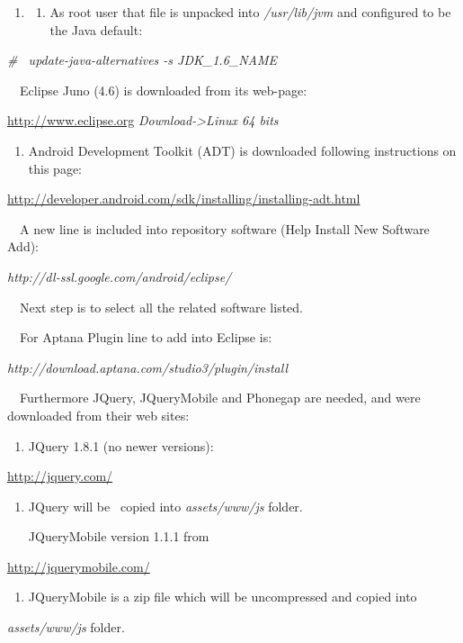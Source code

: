 \documentclass[a4paper]{article}
\begin{document}
\begin{enumerate}
\item \begin{enumerate}
\item[] As root user that file is unpacked into \textit{/usr/lib/jvm}
and configured to be the Java default:
\end{enumerate}
\end{enumerate}
\textit{\# \ }\textit{update-java-alternatives -s JDK\_1.6\_NAME}

\ \ Eclipse Juno (4.6) is downloaded from its web-page:

\href{http://www.eclipse.org/}{http://www.eclipse.org}\textit{
Download-{\textgreater}Linux 64 bits}

\begin{enumerate}
\item[] Android Development Toolkit (ADT) is downloaded following
instructions on this page:
\end{enumerate}
\url{http://developer.android.com/sdk/installing/installing-adt.html}\textit{
}

\ \ A new line is included into repository software (Help 
Install New Software  Add):

{\itshape
http://dl-ssl.google.com/android/eclipse/}

\ \ Next step is to select all the related software listed.

\ \ For Aptana Plugin line to add into Eclipse is: 

{\itshape
http://download.aptana.com/studio3/plugin/install}

\ \ Furthermore JQuery, JQueryMobile and Phonegap are needed, and were
downloaded from their web sites:

\begin{enumerate}
\item[] JQuery 1.8.1 (no newer versions):
\end{enumerate}
\url{http://jquery.com/}\textit{ }

\begin{enumerate}
\item[] JQuery will be \ copied into \textit{assets/www/js} folder.

JQueryMobile version 1.1.1 from
\end{enumerate}
\url{http://jquerymobile.com/}\textit{ }

\begin{enumerate}
\item[] JQueryMobile is a zip file which will be uncompressed and copied
into 
\end{enumerate}
\textit{assets/www/js} folder.
\end{document}
